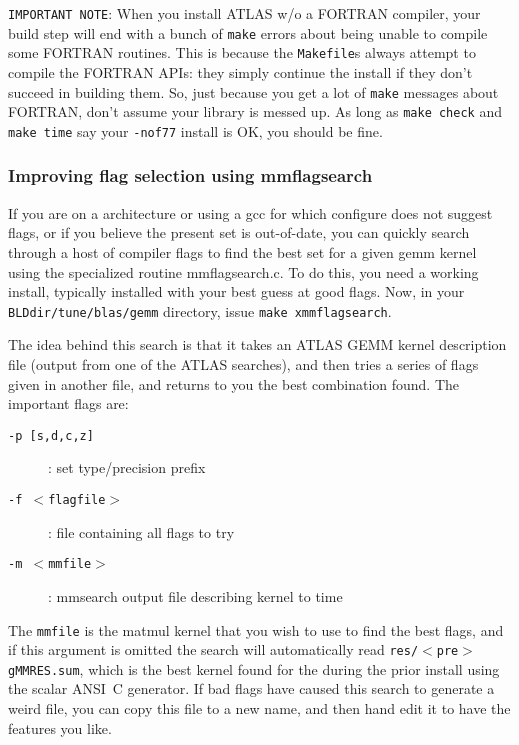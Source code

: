 \documentclass[11pt]{article}
\begin{document}
{\tt IMPORTANT NOTE}: When you install ATLAS w/o a FORTRAN compiler,
your build step will end with a bunch of {\tt make} errors about being
unable to compile some FORTRAN routines.  This is because the {\tt Makefile}s
always attempt to compile the FORTRAN APIs: they simply continue the install
if they don't succeed in building them.  So, just because you get a lot
of {\tt make} messages about FORTRAN, don't assume your library is messed
up.  As long as {\tt make check} and {\tt make time} say your {\tt -nof77}
install is OK, you should be fine.

\newpage
\subsubsection{Improving flag selection using mmflagsearch}
\label{sec-flagsearch}

If you are on a architecture or using a gcc for which configure does
not suggest flags, or if you believe the present set is out-of-date,
you can quickly search through a host of compiler flags to find the
best set for a given gemm kernel using the specialized routine
mmflagsearch.c.  To do this, you need a working install, typically
installed with your best guess at good flags.  Now, in your
{\tt BLDdir/tune/blas/gemm} directory, issue {\tt make xmmflagsearch}.

The idea behind this search is that it takes an ATLAS GEMM kernel description
file (output from one of the ATLAS searches), and then tries a series of
flags given in another file, and returns to you the best combination found.
The important flags are:
\begin{description}
\item [{\tt -p [s,d,c,z]}] : set type/precision prefix
\vspace*{-0.1in}
\item [{\tt -f $<$flagfile$>$}]: file containing all flags to try
\vspace*{-0.1in}
\item [{\tt -m $<$mmfile$>$}]: mmsearch output file describing kernel to time
\end{description}

The {\tt mmfile} is the matmul kernel that you wish to use to find the
best flags, and if this argument is omitted the search will automatically
read {\tt res/$<$pre$>$gMMRES.sum}, which is the best kernel found for the
during the prior install using the scalar ANSI~C generator.  If bad flags
have caused this search to generate a weird file, you can copy this file
to a new name, and then hand edit it to have the features you like.
\end{document}
